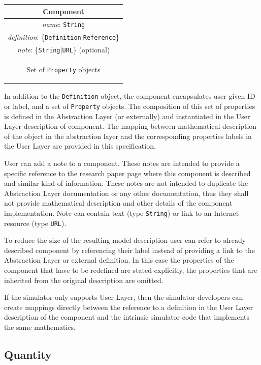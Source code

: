 \documentclass[draftspec]{ninemlspec}
\begin{document}
\begin{table}[htb]
\center
\begin{tabular}{|c|}
\hline
\hline
Component \\
\hline
\hline
{\em name}: {\tt String} \\
\hline
{\em definition}: \{{\tt Definition}$|${\tt Reference}\}\\
\hline
{\em note}: \{{\tt String}$|${\tt URL}\} (optional)\\
\hline
\colorbox{issuecolor}{\parbox{0.4\linewidth}
{\center Set of {\tt Property} objects}} \\
\hline
\end{tabular}
\end{table}

In addition to the {\tt Definition} object, the component encapsulates
user-given ID or label, and a set of {\tt Property} objects. The composition
of this set of properties is defined in the Abstraction Layer (or externally)
and instantiated in the User Layer description of component. The mapping
between mathematical description of the object in the abstraction
layer and the corresponding properties labels in the User Layer are
provided in this specification.

User can add a note to a component. These notes are intended to provide
a specific reference to the research paper page where this component is
described and similar kind of information. These notes are not intended
to duplicate the Abstraction Layer documentation or any other
documentation, thus they shall not provide mathematical description and
other details of the component implementation. Note can contain text
(type {\tt String}) or link to an Internet resource (type {\tt URL}).

To reduce the size of the resulting model description user can refer to
already described component by referencing their label instead of providing
a link to the Abstraction Layer or external definition. In this case the
properties of the component that have to be redefined are stated explicitly,
the properties that are inherited from the original description are omitted.

If the simulator only supports User Layer, then the simulator developers
can create mappings directly between the reference to a definition in the
User Layer description of the component and the intrinsic simulator code
that implements the same mathematics.

\subsection{Quantity}
\label{quantity}
\end{document}
